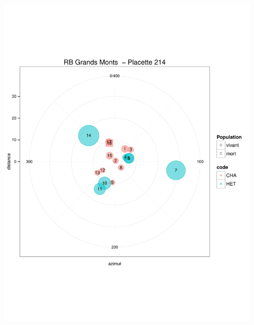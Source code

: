 \documentclass[a4paper]{book}\usepackage[]{graphicx}\usepackage[]{color}
\makeatletter
\def\maxwidth{ %
  \ifdim\Gin@nat@width>\linewidth
    \linewidth
  \else
    \Gin@nat@width
  \fi
}
\newenvironment{knitrout}{}{} %
\makeatother
\begin{document}
\begin{knitrout}
{\centering \includegraphics[width=\maxwidth]{Figures/PlanArbres-21} 

}





\end{knitrout}
\end{document}
